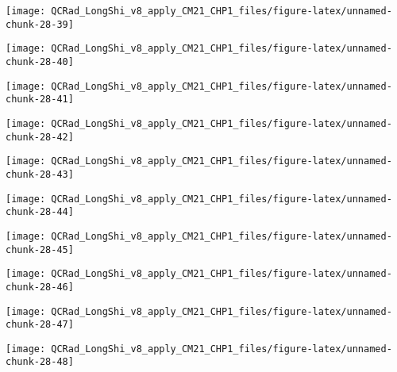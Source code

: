 \documentclass[
  10pt,
  a4paper,oneside]{article}
\begin{document}
\begin{center}\texttt{[image: QCRad\_LongShi\_v8\_apply\_CM21\_CHP1\_files/figure-latex/unnamed-chunk-28-39]} \end{center}

\begin{center}\texttt{[image: QCRad\_LongShi\_v8\_apply\_CM21\_CHP1\_files/figure-latex/unnamed-chunk-28-40]} \end{center}

\begin{center}\texttt{[image: QCRad\_LongShi\_v8\_apply\_CM21\_CHP1\_files/figure-latex/unnamed-chunk-28-41]} \end{center}

\begin{center}\texttt{[image: QCRad\_LongShi\_v8\_apply\_CM21\_CHP1\_files/figure-latex/unnamed-chunk-28-42]} \end{center}

\begin{center}\texttt{[image: QCRad\_LongShi\_v8\_apply\_CM21\_CHP1\_files/figure-latex/unnamed-chunk-28-43]} \end{center}

\begin{center}\texttt{[image: QCRad\_LongShi\_v8\_apply\_CM21\_CHP1\_files/figure-latex/unnamed-chunk-28-44]} \end{center}

\begin{center}\texttt{[image: QCRad\_LongShi\_v8\_apply\_CM21\_CHP1\_files/figure-latex/unnamed-chunk-28-45]} \end{center}

\begin{center}\texttt{[image: QCRad\_LongShi\_v8\_apply\_CM21\_CHP1\_files/figure-latex/unnamed-chunk-28-46]} \end{center}

\begin{center}\texttt{[image: QCRad\_LongShi\_v8\_apply\_CM21\_CHP1\_files/figure-latex/unnamed-chunk-28-47]} \end{center}

\begin{center}\texttt{[image: QCRad\_LongShi\_v8\_apply\_CM21\_CHP1\_files/figure-latex/unnamed-chunk-28-48]} \end{center}
\end{document}
